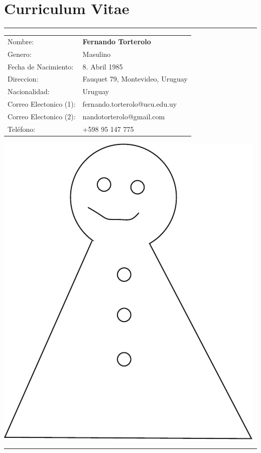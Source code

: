 \chapter*{Curriculum Vitae}
\hrule
\begin{minipage}[t]{0.65\linewidth}
\begin{tabular}{ll}
Nombre: & \textbf{Fernando Torterolo}\\
Genero: & Masulino\\
Fecha de Nacimiento: & 8. Abril 1985\\
Direccion: & Fauquet 79, Montevideo, Uruguay \\
Nacionalidad:    & Uruguay \\
Correo Electonico (1): & fernando.torterolo@ucu.edu.uy\\
Correo Electonico (2): & nandotorterolo@gmail.com\\
Teléfono: & +598 95 147 775\\
\end{tabular} 
\end{minipage}\hfill
\begin{minipage}[t]{0.25\linewidth}
\includegraphics[scale=0.5]{fig/me.pdf}\\[1pc]
\end{minipage}
\hrule

